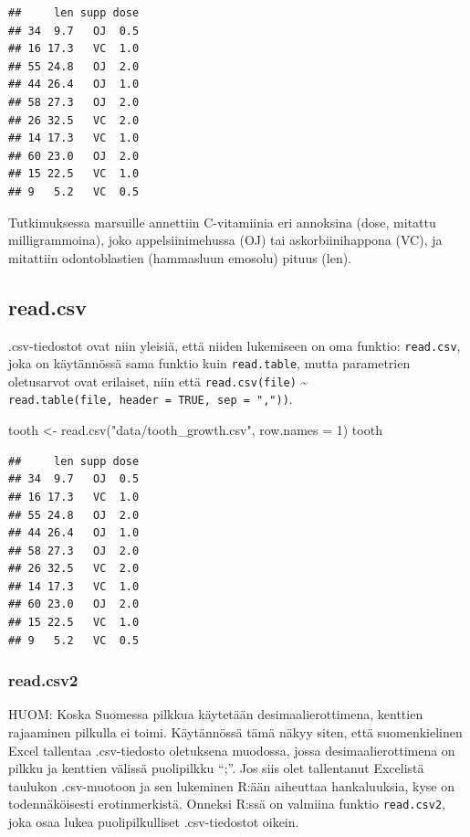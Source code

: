 \documentclass[
]{book}
\newenvironment{Shaded}{\begin{snugshade}}{\end{snugshade}}
\newcommand{\AttributeTok}[1]{\textcolor[rgb]{0.77,0.63,0.00}{#1}}
\newcommand{\DecValTok}[1]{\textcolor[rgb]{0.00,0.00,0.81}{#1}}
\newcommand{\FunctionTok}[1]{\textcolor[rgb]{0.00,0.00,0.00}{#1}}
\newcommand{\NormalTok}[1]{#1}
\newcommand{\OtherTok}[1]{\textcolor[rgb]{0.56,0.35,0.01}{#1}}
\newcommand{\StringTok}[1]{\textcolor[rgb]{0.31,0.60,0.02}{#1}}
\begin{document}
\begin{verbatim}
##     len supp dose
## 34  9.7   OJ  0.5
## 16 17.3   VC  1.0
## 55 24.8   OJ  2.0
## 44 26.4   OJ  1.0
## 58 27.3   OJ  2.0
## 26 32.5   VC  2.0
## 14 17.3   VC  1.0
## 60 23.0   OJ  2.0
## 15 22.5   VC  1.0
## 9   5.2   VC  0.5
\end{verbatim}

Tutkimuksessa marsuille annettiin C-vitamiinia eri annoksina (dose, mitattu milligrammoina), joko appelsiinimehussa (OJ) tai askorbiinihappona (VC), ja mitattiin odontoblastien (hammasluun emosolu) pituus (len).

\hypertarget{read.csv}{%
\subsection{read.csv}\label{read.csv}}

.csv-tiedostot ovat niin yleisiä, että niiden lukemiseen on oma funktio: \texttt{read.csv}, joka on käytännössä sama funktio kuin \texttt{read.table}, mutta parametrien oletusarvot ovat erilaiset, niin että \texttt{read.csv(file)} \textasciitilde{} \texttt{read.table(file,\ header\ =\ TRUE,\ sep\ =\ ","))}.

\begin{Shaded}
\begin{Highlighting}[]
\NormalTok{tooth }\OtherTok{\textless{}{-}} \FunctionTok{read.csv}\NormalTok{(}\StringTok{"data/tooth\_growth.csv"}\NormalTok{, }\AttributeTok{row.names =} \DecValTok{1}\NormalTok{)}
\NormalTok{tooth}
\end{Highlighting}
\end{Shaded}

\begin{verbatim}
##     len supp dose
## 34  9.7   OJ  0.5
## 16 17.3   VC  1.0
## 55 24.8   OJ  2.0
## 44 26.4   OJ  1.0
## 58 27.3   OJ  2.0
## 26 32.5   VC  2.0
## 14 17.3   VC  1.0
## 60 23.0   OJ  2.0
## 15 22.5   VC  1.0
## 9   5.2   VC  0.5
\end{verbatim}

\hypertarget{read.csv2}{%
\subsubsection{read.csv2}\label{read.csv2}}

HUOM: Koska Suomessa pilkkua käytetään desimaalierottimena, kenttien rajaaminen pilkulla ei toimi. Käytännössä tämä näkyy siten, että suomenkielinen Excel tallentaa .csv-tiedosto oletuksena muodossa, jossa desimaalierottimena on pilkku ja kenttien välissä puolipilkku ``;''. Jos siis olet tallentanut Excelistä taulukon .csv-muotoon ja sen lukeminen R:ään aiheuttaa hankaluuksia, kyse on todennäköisesti erotinmerkistä. Onneksi R:ssä on valmiina funktio \texttt{read.csv2}, joka osaa lukea puolipilkulliset .csv-tiedostot oikein.
\end{document}
